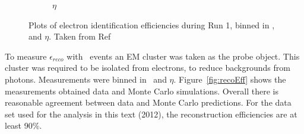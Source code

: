 \begin{figure}[h]
\begin{subfigure}{0.5\textwidth}
	\caption{$\eta$}
\end{subfigure}
\caption{Plots of electron identification efficiencies during Run 1, binned in \eT, and $\eta$. 
Taken from Ref~\cite{Aad:2011mk}}
\label{fig:idEff}
\end{figure}

\par To measure $\epsilon_{reco}$ with \Zee\ events an EM cluster was taken as the probe 
object. This cluster was required to be isolated from electrons, to reduce backgrounds from 
photons. Measurements were binned in \eT\ and $\eta$. Figure~\ref{fig:recoEff} shows the 
measurements obtained data and Monte Carlo simulations. Overall there is reasonable 
agreement between data and Monte Carlo predictions. For the data set used for the analysis in this 
text (2012), the reconstruction efficiencies are at least 90\%.   

